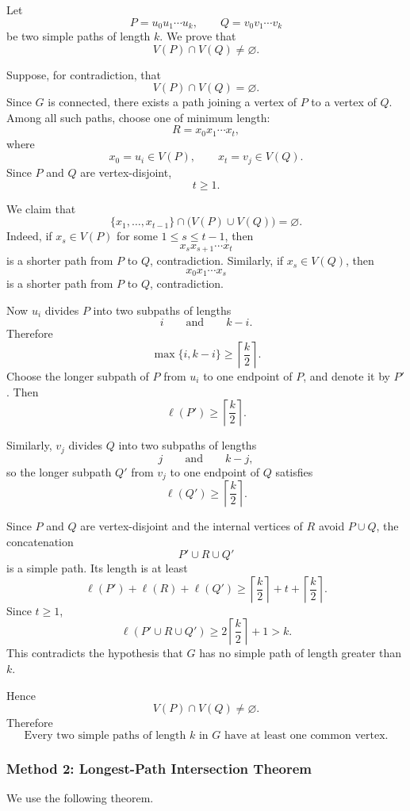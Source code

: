 \documentclass[12pt]{article}
\begin{document}
Let
\[
P=u_0u_1\cdots u_k,
\qquad
Q=v_0v_1\cdots v_k
\]
be two simple paths of length \(k\). We prove that
\[
V(P)\cap V(Q)\neq \varnothing.
\]

Suppose, for contradiction, that
\[
V(P)\cap V(Q)=\varnothing.
\]
Since \(G\) is connected, there exists a path joining a vertex of \(P\) to a vertex of \(Q\). Among all such paths, choose one of minimum length:
\[
R=x_0x_1\cdots x_t,
\]
where
\[
x_0=u_i\in V(P),
\qquad
x_t=v_j\in V(Q).
\]
Since \(P\) and \(Q\) are vertex-disjoint,
\[
t\ge 1.
\]

We claim that
\[
\{x_1,\dots,x_{t-1}\}\cap \bigl(V(P)\cup V(Q)\bigr)=\varnothing.
\]
Indeed, if \(x_s\in V(P)\) for some \(1\le s\le t-1\), then
\[
x_sx_{s+1}\cdots x_t
\]
is a shorter path from \(P\) to \(Q\), contradiction. Similarly, if \(x_s\in V(Q)\), then
\[
x_0x_1\cdots x_s
\]
is a shorter path from \(P\) to \(Q\), contradiction.

Now \(u_i\) divides \(P\) into two subpaths of lengths
\[
i
\qquad\text{and}\qquad
k-i.
\]
Therefore
\[
\max\{i,k-i\}\ge \left\lceil \frac{k}{2}\right\rceil.
\]
Choose the longer subpath of \(P\) from \(u_i\) to one endpoint of \(P\), and denote it by \(P'\). Then
\[
\ell(P')\ge \left\lceil \frac{k}{2}\right\rceil.
\]

Similarly, \(v_j\) divides \(Q\) into two subpaths of lengths
\[
j
\qquad\text{and}\qquad
k-j,
\]
so the longer subpath \(Q'\) from \(v_j\) to one endpoint of \(Q\) satisfies
\[
\ell(Q')\ge \left\lceil \frac{k}{2}\right\rceil.
\]

Since \(P\) and \(Q\) are vertex-disjoint and the internal vertices of \(R\) avoid \(P\cup Q\), the concatenation
\[
P' \cup R \cup Q'
\]
is a simple path. Its length is at least
\[
\ell(P')+\ell(R)+\ell(Q')
\ge
\left\lceil \frac{k}{2}\right\rceil
+t+
\left\lceil \frac{k}{2}\right\rceil.
\]
Since \(t\ge 1\),
\[
\ell(P'\cup R\cup Q')
\ge
2\left\lceil \frac{k}{2}\right\rceil+1
>k.
\]
This contradicts the hypothesis that \(G\) has no simple path of length greater than \(k\).

Hence
\[
V(P)\cap V(Q)\neq \varnothing.
\]
Therefore
\[
\boxed{\text{Every two simple paths of length }k\text{ in }G\text{ have at least one common vertex.}}
\]

\newpage
\subsubsection{Method 2: Longest-Path Intersection Theorem}

We use the following theorem.
\end{document}
